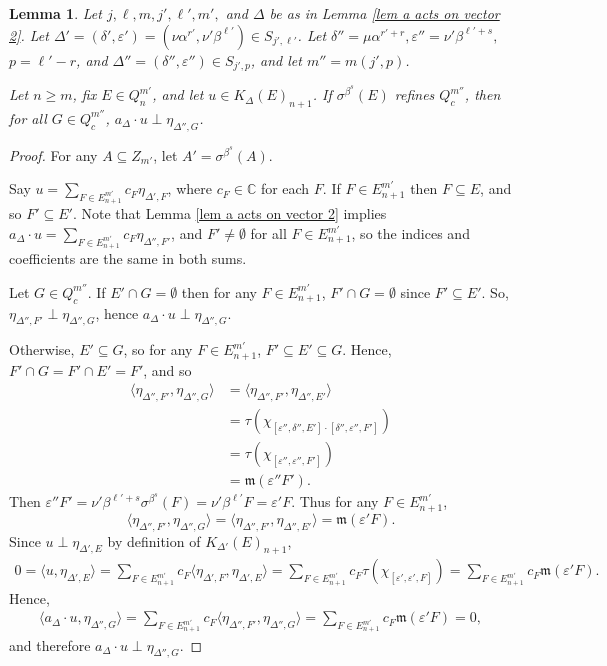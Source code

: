 \documentclass[12pt]{amsart}
\newcommand{\sse}{\subseteq}
\newcommand{\mf}[1]{\mathfrak{#1}}
\newcommand{\emp}{\emptyset}
\newcommand{\C}{\mathbb{C}}
\newcommand{\al}{\alpha}
\newcommand{\be}{\beta}
\newcommand{\de}{\delta}
\newcommand{\De}{\Delta}
\newcommand{\ep}{\varepsilon}
\newcommand{\si}{\sigma}
\theoremstyle{plain} %
\newtheorem{Lemma}[Theorem]{Lemma}
\theoremstyle{definition} %
\begin{document}
\begin{Lemma}\label{lem if E' refines (c=alpha)}
    Let $j, \ell, m, j', \ell', m',$ and $\De$ be as in Lemma \ref{lem a acts on vector 2}. Let $\De'=(\de', \ep') = (\nu \al^{r'}, \nu' \be^{\ell'}) \in S_{j', \ell'}$. Let $\de'' = \mu \al^{r'+r}, \ep''= \nu' \be^{\ell'+s},$ $p = \ell'-r$, and $\De''=(\de'', \ep'') \in S_{j', p}$, and let $m'' = m(j',p)$.

    Let $n \geq m$, fix $E \in Q_n^{m'}$, and let $u \in K_{\De}(E)_{n+1}$. If $\si^{\be^s} (E)$ refines $Q_c^{m''}$, then for all $G \in Q^{m''}_c$, $a_{\De} \cdot u \perp \eta_{\De'', G}$.
\end{Lemma}

\begin{proof}
    For any $A \sse Z_{m'}$, let $A' = \si^{\be^s}(A)$. 

    Say $u = \sum_{F \in E_{n+1}^{m'}} c_F \eta_{\De', F}$, where $c_F \in \C$ for each $F$. If $F \in E_{n+1}^{m'}$ then $F \sse E$, and so $F'\sse E'$. Note that Lemma \ref{lem a acts on vector 2} implies $a_{\De} \cdot u = \sum_{F \in E_{n+1}^{m'}} c_F \eta_{\De'', F'}$, and  $F' \neq \emp$ for all $F \in E_{n+1}^{m'}$, so the indices and coefficients are the same in both sums.
    
    Let $G \in Q_c^{m''}$. If $E' \cap G = \emp$ then for any $F \in E_{n+1}^{m'}$, $F' \cap G=\emp$ since $F' \sse E'$. So, $\eta_{\De'', F'} \perp \eta_{\De'', G}$, hence $a_{\De} \cdot u \perp \eta_{\De'', G}$.

    Otherwise, $E' \sse G$, so for any $F \in E_{n+1}^{m'}$, $F' \sse E' \sse G$. Hence, $F' \cap G = F' \cap E' = F'$, and so 
    \begin{align*}
        \langle \eta_{\De'', F'}, \eta_{\De'', G} \rangle &= \langle \eta_{\De'', F'}, \eta_{\De'', E'}\rangle\\
        &= \tau(\chi_{[\ep'', \de'', E']\cdot[\de'', \ep'', F']})\\
        &= \tau(\chi_{[\ep'', \ep'', F']})\\
        &= \mf{m}(\ep'' F').
    \end{align*}
    Then $\ep'' F' = \nu' \be^{\ell'+s} \si^{\be^{s}}(F) = \nu' \be^{\ell'} F = \ep'F$. Thus for any $F \in E_{n+1}^{m'}$, \[\langle \eta_{\De'', F'}, \eta_{\De'', G}\rangle = \langle \eta_{\De'', F'}, \eta_{\De'', E'} \rangle = \mf{m}(\ep'F).\]
    Since $u \perp \eta_{\De', E}$ by definition of $K_{\De'}(E)_{n+1}$,
    \begin{align*}
        0 = \langle u, \eta_{\De',E}\rangle = \sum_{F \in E_{n+1}^{m'}} c_F \langle \eta_{\De', F}, \eta_{\De', E}\rangle = \sum_{F \in E_{n+1}^{m'}} c_F \tau(\chi_{[\ep', \ep', F]}) = \sum_{F \in E_{n+1}^{m'}} c_F \mf{m}(\ep'F).
    \end{align*}
    Hence,
    \begin{align*}
        \langle a_{\De} \cdot u, \eta_{\De'', G}\rangle = \sum_{F \in E_{n+1}^{m'}} c_F \langle\eta_{\De'', F'}, \eta_{\De'', G} \rangle = \sum_{F \in E_{n+1}^{m'}} c_F \mf{m}(\ep'F) = 0,
    \end{align*}
    and therefore $a_{\De} \cdot u \perp \eta_{\De'', G}$.
\end{proof}
\end{document}
